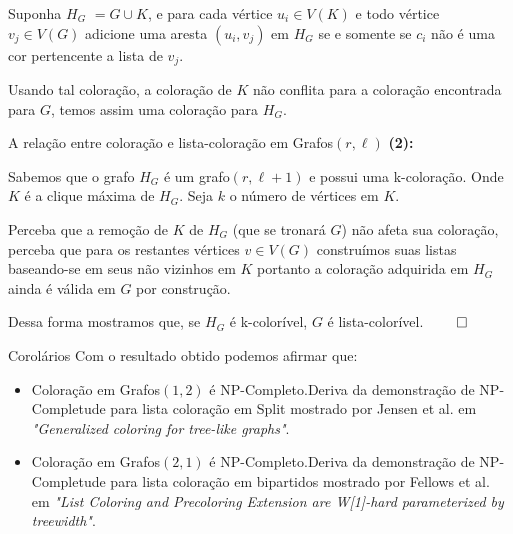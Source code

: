 \documentclass[9pt, compress]{beamer}
\newcommand{\?}{\textcolor{warn}{\textit{?}}}
\begin{document}
    \begin{frame}  
      Suponha $H_G$ $= G \cup K$, e para cada vértice $u_i \in V(K)$ e todo vértice $v_j \in V(G)$ adicione uma aresta $(u_i,v_j) $ em $H_G$ se e somente se $c_i$ não é uma cor pertencente a lista de $v_j$.
      \begin{center}
        \begin{figure}
        
      \end{figure}
      \end{center}   
      Usando tal coloração, a coloração de $K$ não conflita para a coloração encontrada para $G$, temos assim uma coloração para $H_G$. 
    \end{frame}
    \begin{frame}{A relação entre coloração e lista-coloração em Grafos$(r,\ell)$}
      \textbf{(2):}
      
      Sabemos que o grafo $H_G$ é um grafo$(r,\ell+1)$ e possui uma k-coloração. Onde $K$ é a clique máxima de $H_G$.
      Seja $k$ o número de vértices em $K$.
      
      Perceba que a remoção de $K$ de $H_G$ (que se tronará $G$) não afeta sua coloração, perceba que para os restantes vértices $v \in V(G)$ construímos suas listas baseando-se em seus não vizinhos em $K$ portanto a coloração adquirida em $H_G$ ainda é válida em $G$ por construção.
      
      Dessa forma mostramos que, se $H_G$ é k-colorível, $G$ é lista-colorível.
      $\qed$
    \end{frame}
    \begin{frame}{Corolários}
      Com o resultado obtido podemos afirmar que:
      \begin{itemize}
        \item Coloração em Grafos$(1,2)$ é NP-Completo.\newline Deriva da demonstração de NP-Completude para lista coloração em Split mostrado por Jensen et al. em \textit{"Generalized coloring for tree-like graphs"}.
        \item Coloração em Grafos$(2,1)$ é NP-Completo.\newline Deriva da demonstração de NP-Completude para lista coloração em bipartidos mostrado por Fellows et al. em \textit{"List Coloring and Precoloring Extension are W[1]-hard parameterized by treewidth"}.
      \end{itemize}
    \end{frame}
        
\end{document}
